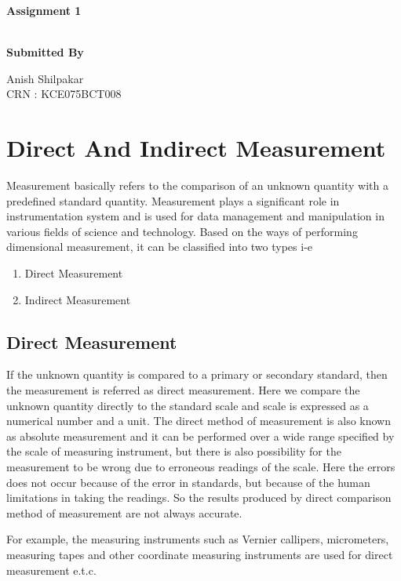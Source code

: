 \documentclass[12pt]{article}
\begin{document}
\begin{center}
\begin{Large}
\textbf{Assignment 1}\\\
\end{Large}
\begin{large}
\textbf{Submitted By }\\
\end{large}
Anish Shilpakar\\
CRN : KCE075BCT008\\
\end{center}

\section{Direct And Indirect Measurement}
Measurement basically refers to the comparison of an unknown quantity with a predefined standard quantity. Measurement plays a significant role in instrumentation system and is used for data management and manipulation in various fields of science and technology.
Based on the ways of performing dimensional measurement, it can be classified into two types i-e 
\begin{enumerate}
\item Direct Measurement 
\item Indirect Measurement
\end{enumerate} 
\subsection{Direct Measurement}
If the unknown quantity is compared to a primary or secondary standard, then the measurement is referred as direct measurement.  Here we compare the unknown quantity directly to the standard scale and scale is expressed as a numerical number and a unit. The direct method of measurement is also known as absolute measurement and it can be performed over a wide range specified by the scale of measuring instrument, but there is also possibility for the measurement to be wrong due to erroneous readings of the scale. Here the errors does not occur because of the error in standards, but because of the human limitations in taking the readings. So the results produced by direct comparison method of measurement are not always accurate. 

For example, the measuring instruments such as Vernier callipers, micrometers, measuring tapes and other coordinate measuring instruments are used for direct measurement e.t.c. 
\end{document}
